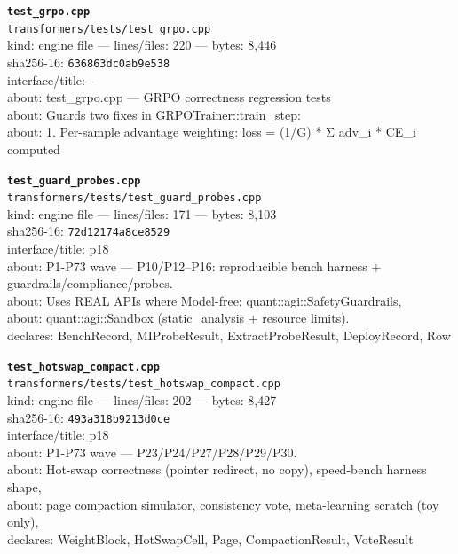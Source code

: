 \noindent\textbf{\texttt{test\_grpo.cpp}}\\
\texttt{transformers/tests/test\_grpo.cpp}\\
kind: engine file --- lines/files: 220 --- bytes: 8,446\\
sha256-16: \texttt{636863dc0ab9e538}\\
interface/title: -\\
about: test\_grpo.cpp — GRPO correctness regression tests\\
about: Guards two fixes in GRPOTrainer::train\_step:\\
about: 1. Per-sample advantage weighting: loss = (1/G) * Σ adv\_i * CE\_i computed\\
\vspace*{6.0pt}

\noindent\textbf{\texttt{test\_guard\_probes.cpp}}\\
\texttt{transformers/tests/test\_guard\_probes.cpp}\\
kind: engine file --- lines/files: 171 --- bytes: 8,103\\
sha256-16: \texttt{72d12174a8ce8529}\\
interface/title: p18\\
about: P1-P73 wave — P10/P12–P16: reproducible bench harness + guardrails/compliance/probes.\\
about: Uses REAL APIs where Model-free: quant::agi::SafetyGuardrails,\\
about: quant::agi::Sandbox (static\_analysis + resource limits).\\
declares: BenchRecord, MIProbeResult, ExtractProbeResult, DeployRecord, Row\\
\vspace*{6.0pt}

\noindent\textbf{\texttt{test\_hotswap\_compact.cpp}}\\
\texttt{transformers/tests/test\_hotswap\_compact.cpp}\\
kind: engine file --- lines/files: 202 --- bytes: 8,427\\
sha256-16: \texttt{493a318b9213d0ce}\\
interface/title: p18\\
about: P1-P73 wave — P23/P24/P27/P28/P29/P30.\\
about: Hot-swap correctness (pointer redirect, no copy), speed-bench harness shape,\\
about: page compaction simulator, consistency vote, meta-learning scratch (toy only),\\
declares: WeightBlock, HotSwapCell, Page, CompactionResult, VoteResult\\
\vspace*{6.0pt}

